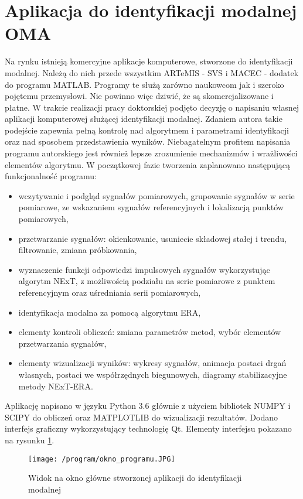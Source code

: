 \section{Aplikacja do identyfikacji modalnej OMA}
Na rynku istnieją komercyjne aplikacje komputerowe, stworzone do identyfikacji modalnej. Należą do nich przede wszystkim ARTeMIS - SVS i MACEC - dodatek do programu MATLAB. Programy te służą zarówno naukowcom jak i szeroko pojętemu przemysłowi. Nie powinno więc dziwić, że są skomercjalizowane i płatne. W trakcie realizacji pracy doktorskiej podjęto decyzję o napisaniu własnej aplikacji komputerowej służącej identyfikacji modalnej. Zdaniem autora takie podejście zapewnia pełną kontrolę nad algorytmem i parametrami identyfikacji oraz nad sposobem przedstawienia wyników. Niebagatelnym profitem napisania programu autorskiego jest również lepsze zrozumienie mechanizmów i wrażliwości elementów algorytmu.
W początkowej fazie tworzenia zaplanowano następującą funkcjonalność programu:
\begin{itemize}[noitemsep]
	\item wczytywanie i podgląd sygnałów pomiarowych, grupowanie sygnałów w serie pomiarowe, ze wskazaniem sygnałów referencyjnych i lokalizacją punktów pomiarowych,
	\item przetwarzanie sygnałów: okienkowanie, usuniecie składowej stałej i trendu, filtrowanie, zmiana próbkowania,
	\item wyznaczenie funkcji odpowiedzi impulsowych sygnałów wykorzystując algorytm NExT, z możliwością podziału na serie pomiarowe z punktem referencyjnym oraz uśredniania serii pomiarowych,
	\item identyfikacja modalna za pomocą algorytmu ERA,
	\item elementy kontroli obliczeń: zmiana parametrów metod, wybór elementów przetwarzania sygnałów,
	\item elementy wizualizacji wyników: wykresy sygnałów, animacja postaci drgań własnych, postaci we współrzędnych biegunowych, diagramy stabilizacyjne metody NExT-ERA.
\end{itemize}
Aplikację napisano w języku Python 3.6 głównie z użyciem bibliotek NUMPY i SCIPY do obliczeń oraz MATPLOTLIB do wizualizacji rezultatów. Dodano interfejs graficzny wykorzystujący technologię Qt. Elementy interfejsu pokazano na rysunku \ref{fig: okno_programu_widok}.

\begin{figure}[h]
	\centering
	\texttt{[image: /program/okno\_programu.JPG]}
	\captionsetup{justification=centering}
	\caption{Widok na okno główne stworzonej aplikacji do identyfikacji modalnej}
	\label{fig: okno_programu_widok}
\end{figure}

